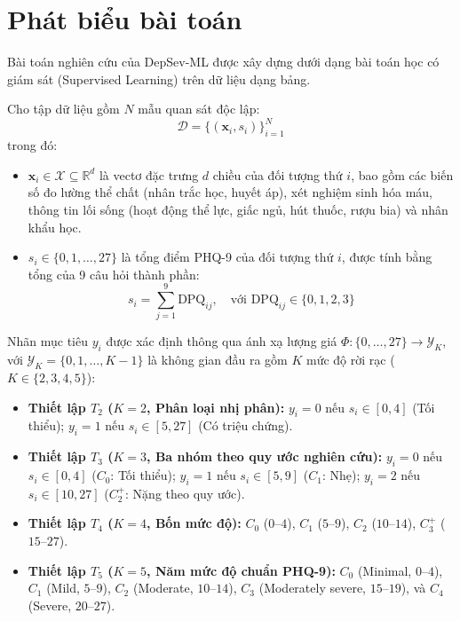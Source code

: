 \section{Phát biểu bài toán}
\label{sec:phat-bieu-bai-toan}

Bài toán nghiên cứu của DepSev-ML được xây dựng dưới dạng bài toán học có giám sát (Supervised Learning) trên dữ liệu dạng bảng.

Cho tập dữ liệu gồm $N$ mẫu quan sát độc lập:
\begin{equation}
    \mathcal{D} = \{(\mathbf{x}_i, s_i)\}_{i=1}^N
\end{equation}
trong đó:
\begin{itemize}
    \item $\mathbf{x}_i \in \mathcal{X} \subseteq \mathbb{R}^d$ là vectơ đặc trưng $d$ chiều của đối tượng thứ $i$, bao gồm các biến số đo lường thể chất (nhân trắc học, huyết áp), xét nghiệm sinh hóa máu, thông tin lối sống (hoạt động thể lực, giấc ngủ, hút thuốc, rượu bia) và nhân khẩu học.
    \item $s_i \in \{0, 1, \dots, 27\}$ là tổng điểm PHQ-9 của đối tượng thứ $i$, được tính bằng tổng của 9 câu hỏi thành phần:
    \begin{equation}
        s_i = \sum_{j=1}^9 \text{DPQ}_{ij}, \quad \text{với } \text{DPQ}_{ij} \in \{0, 1, 2, 3\}
    \end{equation}
\end{itemize}

Nhãn mục tiêu $y_i$ được xác định thông qua ánh xạ lượng giá $\Phi: \{0, \dots, 27\} \to \mathcal{Y}_K$, với $\mathcal{Y}_K = \{0, 1, \dots, K-1\}$ là không gian đầu ra gồm $K$ mức độ rời rạc ($K \in \{2, 3, 4, 5\}$):
\begin{itemize}
    \item \textbf{Thiết lập $T_2$ ($K=2$, Phân loại nhị phân):} $y_i = 0$ nếu $s_i \in [0, 4]$ (Tối thiểu); $y_i = 1$ nếu $s_i \in [5, 27]$ (Có triệu chứng).
    \item \textbf{Thiết lập $T_3$ ($K=3$, Ba nhóm theo quy ước nghiên cứu):} $y_i = 0$ nếu $s_i \in [0, 4]$ ($C_0$: Tối thiểu); $y_i = 1$ nếu $s_i \in [5, 9]$ ($C_1$: Nhẹ); $y_i = 2$ nếu $s_i \in [10, 27]$ ($C_2^+$: Nặng theo quy ước).
    \item \textbf{Thiết lập $T_4$ ($K=4$, Bốn mức độ):} $C_0$ ($0$--$4$), $C_1$ ($5$--$9$), $C_2$ ($10$--$14$), $C_3^+$ ($15$--$27$).
    \item \textbf{Thiết lập $T_5$ ($K=5$, Năm mức độ chuẩn PHQ-9):} $C_0$ (Minimal, $0$--$4$), $C_1$ (Mild, $5$--$9$), $C_2$ (Moderate, $10$--$14$), $C_3$ (Moderately severe, $15$--$19$), và $C_4$ (Severe, $20$--$27$).
\end{itemize}

